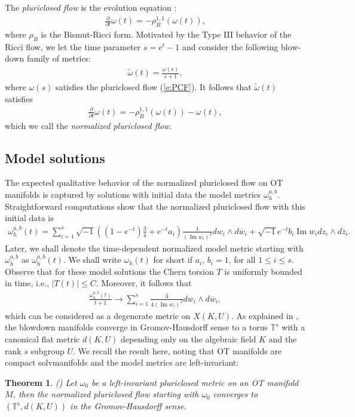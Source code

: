 \documentclass[12pt]{amsart}
\numberwithin{equation}{section}
\newtheorem{thm}[prop]{Theorem}
\numberwithin{prop}{section}
\theoremstyle{definition}
\newcommand{\gw}{\omega}
\newcommand{\til}[1]{\widetilde{#1}}
\renewcommand{\bar}[1]{\overline{#1}}
\begin{document}
The \textit{pluriclosed flow} is the evolution equation \cite{PCF}:
\begin{align}\label{e:PCF}
    \frac{\partial}{\partial t}\omega(t) = -\rho_B^{1,1}(\omega(t)),
\end{align}
where $\rho_B$ is the Bismut-Ricci form.  Motivated by the 
Type III behavior of the Ricci flow, we let the time parameter $s = e^t-1$ and consider the following blow-down family of metrics:
\begin{align*}
    \til{\omega}(t) = \frac{\omega(s)}{s+1},
\end{align*}
where $\omega(s)$ satisfies the pluriclosed flow (\ref{e:PCF}).  It follows that $\til{\omega}(t)$ satisfies
\begin{align}\label{e:PCF_normalized}
    \frac{\partial}{\partial t}\omega(t) = -\rho_B^{1,1}(\omega(t)) - \omega(t),
\end{align}
which we call the \textit{normalized pluriclosed flow}.


%
%
\subsection{Model solutions}\label{s:model cases}
%
%

The expected qualitative behavior of the normalized pluriclosed flow on OT manifolds is captured by solutions with initial data the model metrics $\gw_{h}^{a,b}$.  Straightforward computations show that the normalized pluriclosed flow with this initial data is
\begin{align}\label{e:normalized equation}
    \omega^{a,b}_h(t) = \sum_{i=1}^s \sqrt{-1}((1-e^{-t})\frac{3}{4}+e^{-t}a_i)\frac{1}{(\operatorname{Im}w_i)^2}dw_i\wedge d\bar{w}_i + \sqrt{-1}e^{-t}b_i\operatorname{Im}w_i dz_i\wedge d\bar{z}_i.
\end{align}
Later, we shall denote the time-dependent normalized model metric starting with $\omega^{a,b}_h$ as $\omega^{a,b}_h(t)$. We shall write $\omega_h(t)$ for short if $a_i$, $b_i=1$, for all $1\leq i\leq s$.  
Observe that for these model solutions the Chern torsion $T$ is uniformly bounded in time, i.e., $|T(t)|\leq C$. Moreover, it follows that
\begin{align*}
    \frac{\omega_h^{a,b}(t)}{t+1}\to \sum_{i=1}^s \frac{3}{4(\operatorname{Im}w_i)^2}dw_i\wedge d\bar{w}_i,
\end{align*}
which can be considered as a degenerate metric on $X(K, U)$.  As explained in \cite{fusi2024pluriclosed}, the blowdown manifolds converge in Gromov-Hausdorff sense to a torus $\mathbb T^s$ with a canonical flat metric $d(K, U)$ depending only on the algebraic field $K$ and the rank $s$ subgroup $U$.  We recall the result here, noting that OT manifolds are compact solvmanifolds and the model metrics are left-invariant:
\begin{thm} \label{t:homogOT} (\cite{fusi2024pluriclosed}) Let $\omega_0$ be a left-invariant pluriclosed metric on an OT manifold $M$, then the normalized pluriclosed flow starting with $\omega_0$ converges to $(\mathbb{T}^s,d(K, U))$ in the Gromov-Hausdorff sense.
\end{thm}
\end{document}
